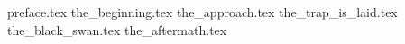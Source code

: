 




{preface.tex}
{the_beginning.tex}
{the_approach.tex}
{the_trap_is_laid.tex}
{the_black_swan.tex}
{the_aftermath.tex}